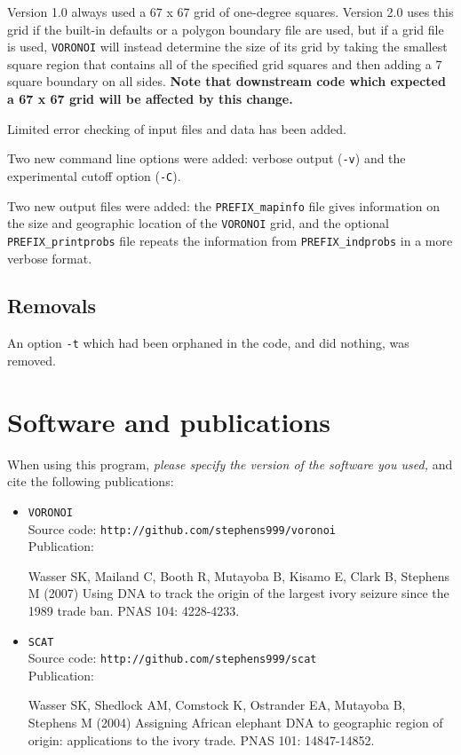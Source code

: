 \documentclass[10pt,titlepage,times,letterpaper]{article}
\def\SCAT{{\tt SCAT} }
\def\VORONOI{{\tt VORONOI} }
\begin{document}
Version 1.0 always used a 67 x 67 grid of one-degree squares.  Version 2.0 uses this
grid if the built-in defaults or a polygon boundary file are used, but if a grid file is used,
\VORONOI will instead determine the size of its grid by taking the smallest square region 
that contains all of the specified grid squares and then adding a 7 square boundary on all 
sides.  {\bf Note that downstream code which expected a 67 x 67 grid will be affected by
this change.}

Limited error checking of input files and data has been added.

Two new command line options were added:  verbose output ({\tt -v}) and the experimental cutoff 
option ({\tt -C}). 

Two new output files were added:  the {\tt PREFIX\_mapinfo} file gives information on the
size and geographic location of the \VORONOI grid, and the optional {\tt PREFIX\_printprobs}
file repeats the information from {\tt PREFIX\_indprobs} in a more verbose format.

\subsection{Removals}

An option {\tt -t} which had been orphaned in the code, and did nothing, was removed.

\section{Software and publications}\label{software}

When using this program, {\it please specify the version of the software you used,} and
cite the following publications:

\begin{itemize}
\item \VORONOI \\
Source code: {\tt http://github.com/stephens999/voronoi} \\
Publication:

Wasser SK, Mailand C, Booth R, Mutayoba B, Kisamo E, Clark B, Stephens M (2007)
Using DNA to track the origin of the largest ivory seizure since the 1989 trade ban.
PNAS 104: 4228-4233.

\item \SCAT \\ 
Source code:  {\tt http://github.com/stephens999/scat} \\
Publication:

Wasser SK, Shedlock AM, Comstock K, Ostrander EA, Mutayoba B, Stephens M (2004)
Assigning African elephant DNA to geographic region of origin:  applications
to the ivory trade.  PNAS 101: 14847-14852.
\end{itemize}
\end{document}

